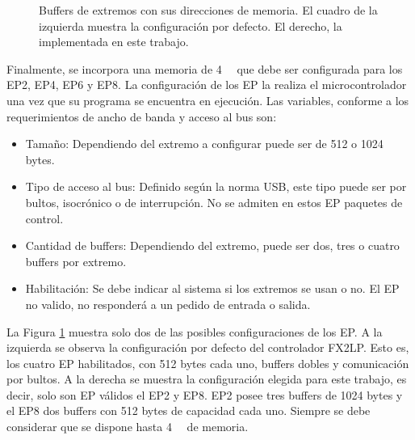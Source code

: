 \begin{figure}[t]
	\caption{Buffers de extremos con sus direcciones de memoria. El cuadro de la izquierda muestra la configuración por defecto. El derecho, la implementada en este trabajo.}
	\label{epbuf}
	\end{figure}
	
	Finalmente, se incorpora una memoria de \SI{4}{\kibi\byte} que debe ser configurada para los EP2, EP4, EP6 y EP8. La configuración de los EP la realiza el microcontrolador una vez que su programa se encuentra en ejecución. Las variables, conforme a los requerimientos de ancho de banda y acceso al bus son:
	
	\begin{itemize}
		\item Tamaño: Dependiendo del extremo a configurar puede ser de 512 o 1024 bytes.
		\item Tipo de acceso al bus: Definido según la norma USB, este tipo puede ser por bultos, isocrónico o de interrupción. No se admiten en estos EP paquetes de control.
		\item Cantidad de buffers: Dependiendo del extremo, puede ser dos, tres o cuatro buffers por extremo.
		\item Habilitación: Se debe indicar al sistema si los extremos se usan o no. El EP no valido, no responderá a un pedido de entrada o salida.
	\end{itemize}
	
	La Figura \ref{epbuf} muestra solo dos de las posibles configuraciones de los EP. A la izquierda se observa la configuración por defecto del controlador FX2LP. Esto es, los cuatro EP habilitados, con 512 bytes cada uno, buffers dobles y comunicación por bultos. A la derecha se muestra la configuración elegida para este trabajo, es decir, solo son EP válidos el EP2 y EP8. EP2 posee tres buffers de 1024 bytes y el EP8 dos buffers con 512 bytes de capacidad cada uno. Siempre se debe considerar que se dispone hasta \SI{4}{\kibi\byte} de memoria.%
	
